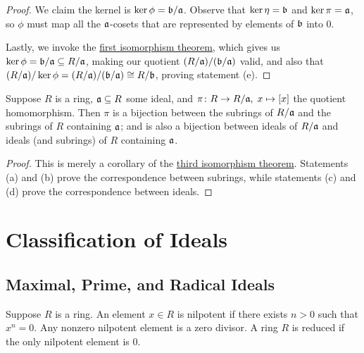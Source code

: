 \begin{proof}
    We claim the kernel is \(\ker\phi = \mathfrak{b/a}\).
    Observe that \(\ker\eta = \mathfrak{b}\) and \(\ker\pi = \mathfrak{a}\),
    so \(\phi\) must map all the \(\mathfrak{a}\)-cosets
    that are represented by elements of \(\mathfrak{b}\) into \(0\).

    Lastly, we invoke the \hyperref[thm:iso-1-ring]{first isomorphism theorem},
    which gives us \(\ker\phi = \mathfrak{b/a} \subseteq R/\mathfrak{a}\),
    making our quotient \((R/\mathfrak{a})/(\mathfrak{b/a})\) valid,
    and also that \((R/\mathfrak{a})/\ker\phi = (R/\mathfrak{a})/(\mathfrak{b/a}) \cong R/\mathfrak{b}\),
    proving statement (e).
\end{proof}

\begin{theorem}\label{thm:iso-4-ring}
    Suppose \(R\) is a ring, \(\mathfrak{a} \subseteq R\) some ideal,
    and \(\pi\colon R\to R/\mathfrak{a},\;x\mapsto[x]\) the quotient homomorphism.
    Then \(\pi\) is a bijection between the subrings of \(R/\mathfrak{a}\)
    and the subrings of \(R\) containing \(\mathfrak{a}\);
    and is also a bijection between ideals of \(R/\mathfrak{a}\)
    and ideals (and subrings) of \(R\) containing \(\mathfrak{a}\).
\end{theorem}
\begin{proof}
    This is merely a corollary of
    the \hyperref[thm:iso-3-ring]{third isomorphism theorem}.
    Statements (a) and (b) prove the correspondence between subrings,
    while statements (c) and (d) prove the correspondence between ideals.
\end{proof}


\section{Classification of Ideals}

\subsection*{Maximal, Prime, and Radical Ideals}

\begin{definition}
    Suppose \(R\) is a ring.
    An element \(x \in R\) is nilpotent if there exists \(n > 0\) such that \(x^n = 0\).
    Any nonzero nilpotent element is a zero divisor.
    A ring \(R\) is reduced if the only nilpotent element is 0.
\end{definition}

